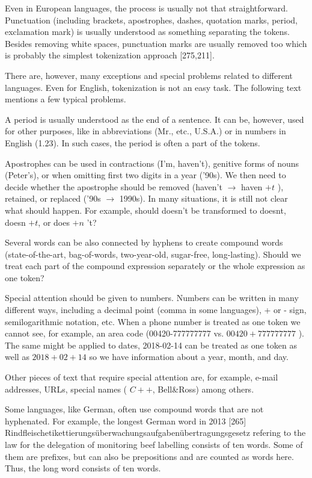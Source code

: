 \documentclass[11pt,openany,executivepaper]{book}
\begin{document}
Even in European languages, the process is usually not that straightforward. Punctuation (including brackets, apostrophes, dashes, quotation marks, period, exclamation mark) is usually understood as something separating the tokens. Besides removing white spaces, punctuation marks are usually removed too which is probably the simplest tokenization approach [275,211].

There are, however, many exceptions and special problems related to different languages. Even for English, tokenization is not an easy task. The following text mentions a few typical problems.

A period is usually understood as the end of a sentence. It can be, however, used for other purposes, like in abbreviations (Mr., etc., U.S.A.) or in numbers in English (1.23). In such cases, the period is often a part of the tokens.

Apostrophes can be used in contractions (I'm, haven't), genitive forms of nouns (Peter's), or when omitting first two digits in a year ('90s). We then need to decide whether the apostrophe should be removed (haven't $\rightarrow$ haven $+t$ ), retained, or replaced ('90s $\rightarrow$ 1990s). In many situations, it is still not clear what should happen. For example, should doesn't be transformed to doesnt, doesn $+t$, or does $+n$ 't?

Several words can be also connected by hyphens to create compound words (state-of-the-art, bag-of-words, two-year-old, sugar-free, long-lasting). Should we treat each part of the compound expression separately or the whole expression as one token?

Special attention should be given to numbers. Numbers can be written in many different ways, including a decimal point (comma in some languages), + or - sign, semilogarithmic notation, etc. When a phone number is treated as one token we cannot see, for example, an area code (00420-777777777 vs. $00420+777777777$ ). The same might be applied to dates, 2018-02-14 can be treated as one token as well as $2018+02+14$ so we have information about a year, month, and day.

Other pieces of text that require special attention are, for example, e-mail addresses, URLs, special names ( $C++$, Bell\&Ross) among others.

Some languages, like German, often use compound words that are not hyphenated. For example, the longest German word in 2013 [265] Rindfleischetikettierungsüberwachungsaufgabenübertragungsgesetz refering to the law for the delegation of monitoring beef labelling consists of ten words. Some of them are prefixes, but can also be prepositions and are counted as words here. Thus, the long word consists of ten words.
\end{document}
